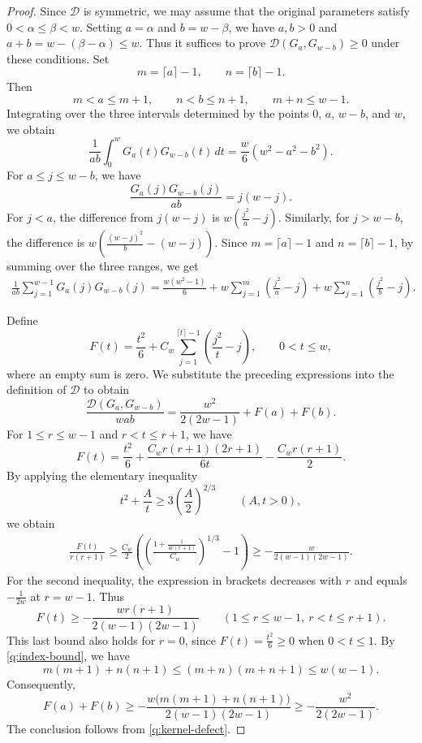 \documentclass[reqno, 11pt]{article}
\numberwithin{equation}{section}
\theoremstyle{definition}
\numberwithin{equation}{section}
\begin{document}
\begin{proof}

Since $\mathcal D$ is symmetric, we may assume that
the original parameters satisfy $0<\alpha\le\beta<w$.
Setting $a=\alpha$ and $b=w-\beta$, we have
$a,b>0$ and $a+b=w-(\beta-\alpha)\le w$.
Thus it suffices to prove
$\mathcal D(G_a,G_{w-b})\ge0$ under these conditions.
 Set
\[
m=\lceil a\rceil-1,\qquad n=\lceil b\rceil-1.
\]
Then
\begin{equation}\label{q:index-bound}
m<a\le m+1,\qquad n<b\le n+1,\qquad m+n\le w-1.
\end{equation}
Integrating over the three intervals determined by the points \(0\), \(a\), \(w-b\), and \(w\), we obtain
\[
\frac1{ab}\int_0^wG_a(t)G_{w-b}(t)\,dt=\frac w6(w^2-a^2-b^2).
\]
For $a\le j\le w-b$, we have
\[
\frac{G_a(j)G_{w-b}(j)}{ab}=j(w-j).
\]
For $j<a$, the difference from $j(w-j)$ is
$w\left(\frac{j^2}{a}-j\right)$. Similarly, for $j>w-b$, the
difference is $w\left(\frac{(w-j)^2}{b}-(w-j)\right)$.
Since $m=\lceil a\rceil-1$ and $n=\lceil b\rceil-1$,
by summing over the three ranges, we get
\begin{align*}
\frac1{ab}\sum_{j=1}^{w-1}G_a(j)G_{w-b}(j)
=\frac{w(w^2-1)}6+w\sum_{j=1}^{m}\left(\frac{j^2}{a}-j\right)
+w\sum_{j=1}^{n}\left(\frac{j^2}{b}-j\right).
\end{align*}



Define
\[
F(t)=\frac{t^2}{6}
+C_w\sum_{j=1}^{\lceil t\rceil-1}
\left(\frac{j^2}{t}-j\right),\qquad 0<t\le w,
\]
where an empty sum is zero. We substitute the preceding expressions into the definition of $\mathcal D$ to obtain
\begin{equation}\label{q:kernel-defect}
\frac{\mathcal D(G_a,G_{w-b})}{wab}
=\frac{w^2}{2(2w-1)}+F(a)+F(b).
\end{equation}
For $1\le r\le w-1$ and $r<t\le r+1$, we have 
\[
F(t)=\frac{t^2}{6}+\frac{C_wr(r+1)(2r+1)}{6t}-\frac{C_wr(r+1)}2.
\]
By applying the elementary inequality
\[
t^2+\frac{A}{t}\ge3\left(\frac{A}{2}\right)^{2/3}
\qquad(A,t>0),
\]
we obtain
\begin{align*}
\frac{F(t)}{r(r+1)}\ge\frac{C_w}{2}
\left(
\left(\frac{1+\frac1{4r(r+1)}}{C_w}\right)^{1/3}-1
\right)\ge-\frac{w}{2(w-1)(2w-1)}.
\end{align*}
For the second inequality, the expression in brackets decreases with
$r$ and equals $-\frac{1}{2w}$ at $r=w-1$. Thus
\[
F(t)\ge-\frac{wr(r+1)}{2(w-1)(2w-1)}
\qquad(1\le r\le w-1,\ r<t\le r+1).
\]
This last bound also holds for $r=0$, since $F(t)=\frac{t^2}{6}\ge0$ when $0<t\le1$.
By \eqref{q:index-bound}, we have 
\[
m(m+1)+n(n+1)\le(m+n)(m+n+1)\le w(w-1).
\]
Consequently,
\[
F(a)+F(b)\ge-\frac{w\bigl(m(m+1)+n(n+1)\bigr)}{2(w-1)(2w-1)}\ge-\frac{w^2}{2(2w-1)}.
\]
The conclusion follows from \eqref{q:kernel-defect}.
\end{proof}
\end{document}

